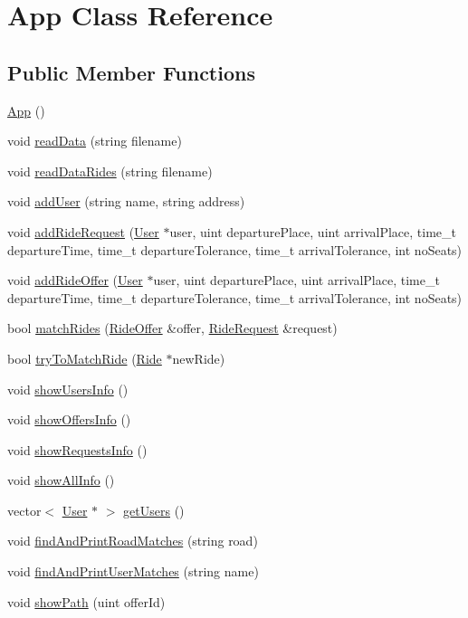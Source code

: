 \hypertarget{class_app}{}\section{App Class Reference}
\label{class_app}
\subsection*{Public Member Functions}
\begin{DoxyCompactItemize}
\item 
\hyperlink{class_app_acb8cbf3e285b91d0170ffe87df5989c5}{App} ()
\item 
void \hyperlink{class_app_ab996c03e3b8455a98c3ee32684353bf4}{read\+Data} (string filename)
\item 
void \hyperlink{class_app_a22ee53e2dc589184357e31a61bbb1bbc}{read\+Data\+Rides} (string filename)
\item 
void \hyperlink{class_app_a726ada082015afbaf04b4f2bcc4dbd6d}{add\+User} (string name, string address)
\item 
void \hyperlink{class_app_ac03ffaeef9892bec7f6b304c647073c9}{add\+Ride\+Request} (\hyperlink{class_user}{User} $\ast$user, uint departure\+Place, uint arrival\+Place, time\+\_\+t departure\+Time, time\+\_\+t departure\+Tolerance, time\+\_\+t arrival\+Tolerance, int no\+Seats)
\item 
void \hyperlink{class_app_a5510b9f90f870dbf3b6c2ab678e63f27}{add\+Ride\+Offer} (\hyperlink{class_user}{User} $\ast$user, uint departure\+Place, uint arrival\+Place, time\+\_\+t departure\+Time, time\+\_\+t departure\+Tolerance, time\+\_\+t arrival\+Tolerance, int no\+Seats)
\item 
bool \hyperlink{class_app_ab93229e931835d421b5bb9e2fa241f44}{match\+Rides} (\hyperlink{class_ride_offer}{Ride\+Offer} \&offer, \hyperlink{class_ride_request}{Ride\+Request} \&request)
\item 
bool \hyperlink{class_app_a7a0b847d3e002f9fefc38cca7474f4f9}{try\+To\+Match\+Ride} (\hyperlink{class_ride}{Ride} $\ast$new\+Ride)
\item 
void \hyperlink{class_app_a587b90a006f1dacc52608259f729ee30}{show\+Users\+Info} ()
\item 
void \hyperlink{class_app_a7872c96b950fd8e123d85dfdfaf3f96c}{show\+Offers\+Info} ()
\item 
void \hyperlink{class_app_ae670afaf5556ba6faafdb318333adcd7}{show\+Requests\+Info} ()
\item 
void \hyperlink{class_app_afe57cd7093f69c8ecf7ceacd1f4688db}{show\+All\+Info} ()
\item 
vector$<$ \hyperlink{class_user}{User} $\ast$ $>$ \hyperlink{class_app_a389988991bdbe0002c9df1245708c29e}{get\+Users} ()
\item 
void \hyperlink{class_app_a236d85a53ee5332cc077d8c50c5aec0c}{find\+And\+Print\+Road\+Matches} (string road)
\item 
void \hyperlink{class_app_ad1f6134ea7c35ea0e84567ef73979ed7}{find\+And\+Print\+User\+Matches} (string name)
\item 
void \hyperlink{class_app_a486e65c74481e5f4355074f86e0ef111}{show\+Path} (uint offer\+Id)
\end{DoxyCompactItemize}


